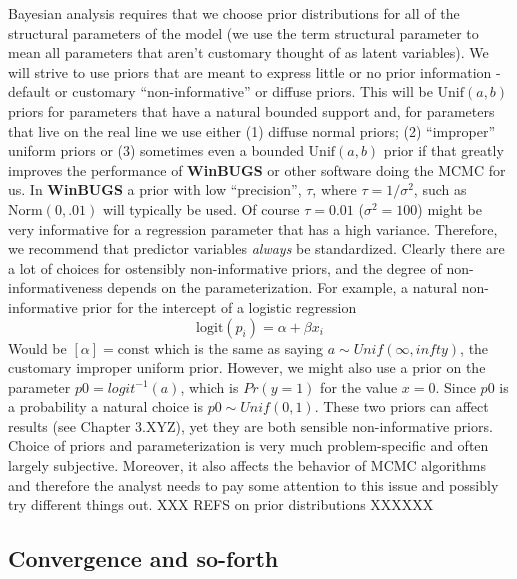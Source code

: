 Bayesian analysis requires that we choose prior
distributions for all of the structural parameters of the model (we
use the term structural parameter to mean all parameters that aren't
customary thought of as latent variables). We will strive to use
priors that are meant to express little or no prior information -
default or customary ``non-informative'' or diffuse priors. This will
be $\mbox{Unif}(a,b)$ priors for parameters that have a natural
bounded support and, for parameters that live on the real line we use
either (1) diffuse normal priors; (2) ``improper'' uniform priors or
(3) sometimes even a bounded $\mbox{Unif}(a,b)$ prior if that greatly
improves the performance of {\bf WinBUGS} or other software doing the MCMC
for us.  In {\bf WinBUGS} a prior with low ``precision'', $\tau$, where
$\tau = 1/\sigma^2$, such as $\mbox{Norm}(0,.01)$ will typically be
used. Of course $\tau = 0.01$ ($\sigma^{2} = 100$) might be very
informative for a regression parameter that has a high
variance. Therefore, we recommend that predictor variables {\it
  always} be standardized. Clearly there are a lot of choices for
ostensibly non-informative priors, and the degree of
non-informativeness depends on the parameterization. For example, a
natural non-informative prior for the intercept of a logistic
regression
\[
\mbox{logit}(p_{i}) = \alpha + \beta x_{i}
\]
Would be $[\alpha] = \mbox{const}$ which is the same as saying $a \sim
Unif(\infty,infty)$, the customary improper uniform prior.
However, we might also use a prior on the parameter $p0
= logit^{-1}(a)$, which is $Pr(y=1)$ for the value $x=0$. Since $p0$ is a
probability a natural choice is $p0 \sim Unif(0,1)$. These two priors can
affect results (see Chapter 3.XYZ), yet they are both sensible
non-informative priors. Choice of priors and parameterization is
very much problem-specific and often largely subjective. Moreover, it
also affects the behavior of MCMC algorithms and therefore the analyst
needs to pay some attention to this issue and possibly try different
things out.
XXX REFS on prior distributions XXXXXX

\subsection{Convergence and so-forth}

